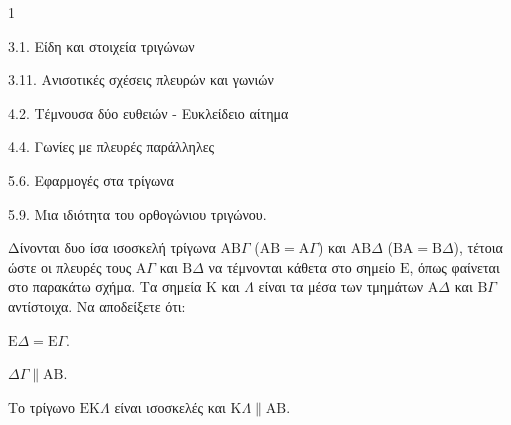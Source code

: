\begin{ylh}{1}
    \item 3.1. Είδη και στοιχεία τριγώνων
    \item 3.11. Ανισοτικές σχέσεις πλευρών και γωνιών
    \item 4.2. Τέμνουσα δύο ευθειών - Ευκλείδειο αίτημα
    \item 4.4. Γωνίες με πλευρές παράλληλες
    \item 5.6. Εφαρμογές στα τρίγωνα
    \item 5.9. Μια ιδιότητα του ορθογώνιου τριγώνου.
\end{ylh}
Δίνονται δυο ίσα ισοσκελή τρίγωνα $\mathrm{A}\mathrm{B}\Gamma$ ($\mathrm{A}\mathrm{B}=\mathrm{A}\Gamma$) και $\mathrm{A}\mathrm{B}\Delta$ ($\mathrm{B}\mathrm{A}=\mathrm{B}\Delta$), τέτοια ώστε οι πλευρές τους $\mathrm{A}\Gamma$ και $\mathrm{B}\Delta$ να τέμνονται κάθετα στο σημείο $\mathrm{E}$, όπως φαίνεται στο παρακάτω σχήμα. Τα σημεία $\mathrm{K}$ και $\Lambda$ είναι τα μέσα των τμημάτων $\mathrm{A}\Delta$ και $\mathrm{B}\Gamma$ αντίστοιχα.
Να αποδείξετε ότι:
\begin{alist}
    \item $\mathrm{E}\Delta = \mathrm{E}\Gamma$. 
    \item $\Delta\Gamma \parallel \mathrm{A}\mathrm{B}$. 
    \item Το τρίγωνο $\mathrm{E}\mathrm{K}\Lambda$ είναι ισοσκελές και $\mathrm{K}\Lambda \parallel \mathrm{A}\mathrm{B}$. 
\end{alist}
